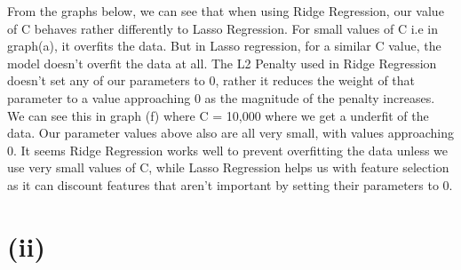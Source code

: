 \documentclass[11pt]{article} %
\begin{document}
From the graphs below, we can see that when using Ridge Regression, our value of C behaves rather differently to Lasso Regression. For small values of C i.e in graph(a), it overfits the data. But in Lasso regression, for a similar C value, the model doesn't overfit the data at all. The L2 Penalty used in Ridge Regression doesn't set any of our parameters to 0, rather it reduces the weight of that parameter to a value approaching 0 as the magnitude of the penalty increases. We can see this in graph (f) where C = 10,000 where we get a underfit of the data. Our parameter values above also are all very small, with values approaching 0. It seems Ridge Regression works well to prevent overfitting the data unless we use very small values of C, while Lasso Regression helps us with feature selection as it can discount features that aren't important by setting their parameters to 0.
\section{(ii)} 
\end{document}
